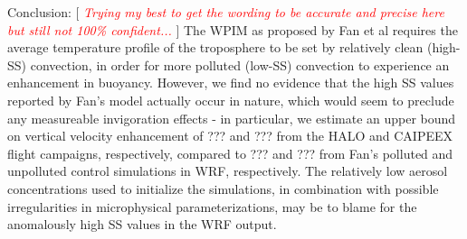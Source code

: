 \documentclass{article}
\newcommand{\klcomm}[1]{\textcolor{red}{\textit{#1}}}
\begin{document}
Conclusion: [ \klcomm{Trying my best to get the wording to be accurate and precise here but still not 100\% confident...} ] The WPIM as proposed by Fan et al requires the average temperature profile of the troposphere to be set by relatively clean (high-SS) convection, in order for more polluted (low-SS) convection to experience an enhancement in buoyancy. However, we find no evidence that the high SS values reported by Fan's model actually occur in nature, which would seem to preclude any measureable invigoration effects - in particular, we estimate an upper bound on vertical velocity enhancement of ??? and ??? from the HALO and CAIPEEX flight campaigns, respectively, compared to ??? and ??? from Fan's polluted and unpolluted control simulations in WRF, respectively. The relatively low aerosol concentrations used to initialize the simulations, in combination with possible irregularities in microphysical parameterizations, may be to blame for the anomalously high SS values in the WRF output.
\end{document}
